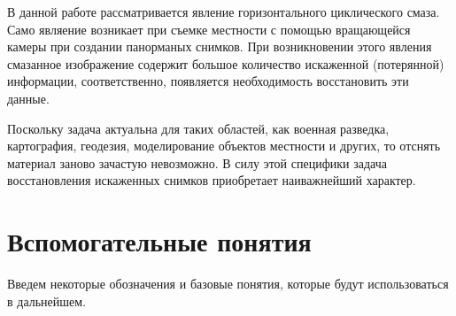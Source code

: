 \documentclass[a4paper]{article}
\theoremstyle{definition}
\begin{document}
    В данной работе рассматривается явление горизонтального циклического смаза. Само являение возникает при съемке местности с помощью вращающейся камеры при создании панорманых снимков. При возникновении этого явления смазанное изображение содержит большое количество искаженной (потерянной) информации, соответственно, появляется необходимость восстановить эти данные.


    Поскольку задача актуальна для таких областей, как военная разведка, картография, геодезия, моделирование объектов местности и других, то отснять материал заново зачастую невозможно. В силу этой специфики задача восстановления искаженных снимков приобретает наиважнейший характер.


    \newpage

    \section{Вспомогательные понятия}


    Введем некоторые обозначения и базовые понятия, которые будут использоваться в дальнейшем.
\vspace*{0.3cm}
\end{document}
